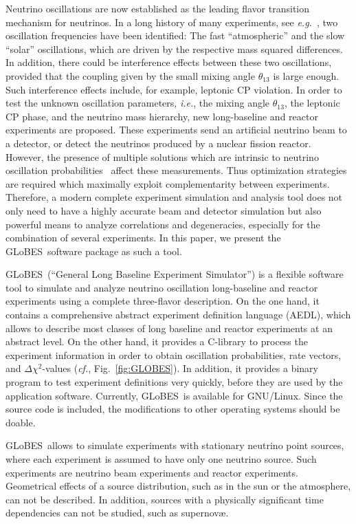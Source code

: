 \documentclass[12pt,a4paper]{article}
\newcommand{\ie}{{\it i.e.}}
\newcommand{\eg}{{\it e.g.}}
\newcommand{\cf}{{\it cf.}}
\newcommand{\fig}{Fig.}
\newcommand{\GLOBES}{{\sf GLoBES}}
\newcommand{\figu}[1]{\fig~\ref{fig:#1}}
\begin{document}
Neutrino oscillations are now established as the leading flavor
transition mechanism for neutrinos. In a long history of many experiments, see
\eg~\cite{Barger:2003qi}, 
two oscillation
frequencies have been identified: The fast ``atmospheric'' and the
slow ``solar'' oscillations, which are driven by the respective
mass squared differences.  In addition, there could be interference
effects between these two oscillations, provided that the coupling given by 
the small mixing angle $\theta_{13}$ is large enough. Such interference
effects include, for example, leptonic CP violation.  In order to
test the unknown oscillation parameters, \ie, the mixing angle $\theta_{13}$,
 the leptonic CP phase, and the
neutrino mass hierarchy, new long-baseline and reactor experiments 
are proposed.
These experiments send an artificial neutrino beam to a detector, or
detect the neutrinos produced by a nuclear fission reactor. However,
the presence of multiple solutions which are intrinsic to
 neutrino oscillation probabilities~\cite{Fogli:1996pv,
Burguet-Castell:2001ez,Minakata:2001qm,Barger:2001yr} 
affect these measurements.
Thus optimization strategies are required which maximally exploit 
complementarity between experiments. Therefore, a modern complete experiment 
simulation  and analysis tool does not only need to have 
a highly accurate beam and detector simulation but also powerful 
means to analyze correlations and degeneracies, especially for the combination
of several experiments.
In this paper, we present the \GLOBES\ software package
as such a tool.

\GLOBES\ (``General Long Baseline Experiment Simulator'') is a flexible
software tool to simulate and analyze neutrino oscillation 
long-baseline and reactor experiments using a 
complete three-flavor description. On the
one hand, it contains a comprehensive abstract experiment definition
language (AEDL), which allows to describe 
most classes of long baseline and reactor experiments
at an abstract level. On the other hand, it provides a C-library to 
process the experiment information in order to obtain oscillation
probabilities, rate vectors, and $\Delta \chi^2$-values (\cf, \figu{GLOBES}). 
In addition, it provides a binary program to test experiment
definitions very quickly, before they are used by the application software.
Currently, \GLOBES\ is available for GNU/Linux. Since the source code is 
included, the modifications to other operating systems should be doable.

\GLOBES\ allows to simulate experiments with stationary neutrino point 
sources, where each experiment is assumed to have only one neutrino source.
Such experiments are neutrino beam experiments and reactor experiments. 
Geometrical effects of a source distribution, such as in the sun or the 
atmosphere, can not be described. In addition, sources with a physically 
significant time dependencies  can not be studied, such as  supernov\ae. 
\end{document}
